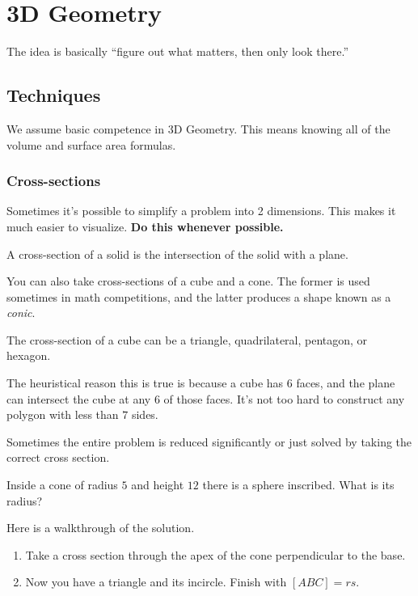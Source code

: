 \documentclass[blue,onecol]{shooting}
\begin{document}
\chapter{3D Geometry}










The idea is basically “figure out what matters, then only look there.”
\section{Techniques}
We assume basic competence in 3D Geometry. This means knowing all of the volume and surface area formulas.

\subsection{Cross-sections}
Sometimes it's possible to simplify a problem into 2 dimensions. This makes it much easier to visualize. \textbf{Do this whenever possible.}

\begin{defi}
A cross-section of a solid is the intersection of the solid with a plane.
\end{defi}

You can also take cross-sections of a cube and a cone. The former is used sometimes in math competitions, and the latter produces a shape known as a \textit{conic}.

\begin{theo}
The cross-section of a cube can be a triangle, quadrilateral, pentagon, or hexagon.
\end{theo}

The heuristical reason this is true is because a cube has $6$ faces, and the plane can intersect the cube at any $6$ of those faces. It's not too hard to construct any polygon with less than $7$ sides.

Sometimes the entire problem is reduced significantly or just solved by taking the correct cross section.

\begin{exam}
Inside a cone of radius $5$ and height $12$ there is a sphere inscribed. What is its radius?
\end{exam}
\begin{sol}
Here is a walkthrough of the solution.
\begin{enumerate}
    \item Take a cross section through the apex of the cone perpendicular to the base.
    
    \item Now you have a triangle and its incircle. Finish with $[ABC]=rs.$
\end{enumerate}
\end{sol}
\end{document}
